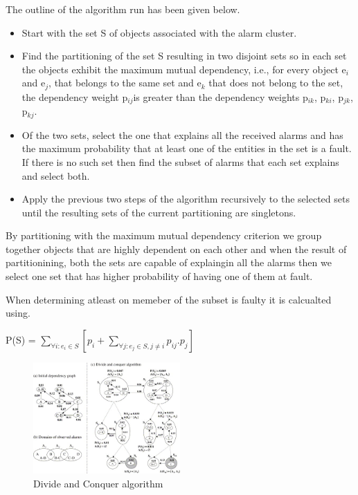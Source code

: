 \documentclass[10pt]{sigplan-proc-varsize}
\begin{document}
The outline of the algorithm run has been given below.

\begin{itemize}
  \item Start with the set S of objects associated with the alarm cluster.
  \item Find the partitioning of the set S resulting in two disjoint sets so in each set the objects exhibit the maximum mutual dependency, i.e., for every object e$_i$ and e$_j$, that belongs to the same set and e$_k$ that does not belong to the set, the dependency weight p$_{ij}$is greater than the dependency weights p$_{ik}$, p$_{ki}$, p$_{jk}$, p$_{kj}$.
  \item Of the two sets, select the one that explains all the received alarms and has the maximum probability that at least one of the entities in the set is a fault. If there is no such set then find the subset of alarms that each set explains and select both.
  \item Apply the previous two steps of the algorithm recursively to the selected sets until the resulting sets of the current partitioning are singletons.
\end{itemize}

By partitioning with the maximum mutual dependency criterion we group together objects that are highly dependent on each other and when the result of partitionining, both the sets are capable of explaingin all the alarms then we select one set that has higher probability of having one of them at fault. 

When determining atleast on memeber of the subset is faulty it is calcualted using. 

P(S) = ${\underset{\forall i:e_i \in S}{\sum}}[p_i + \underset{\forall j:e_j \in S , j \neq i}{\sum} p_{ij}.p_j]$


\begin{figure}[h!]
  \caption{Divide and Conquer algorithm \cite{Katzela:95}}
  \centering
    \includegraphics[width=0.5\textwidth]{Fig5}
\end{figure}
\end{document}

